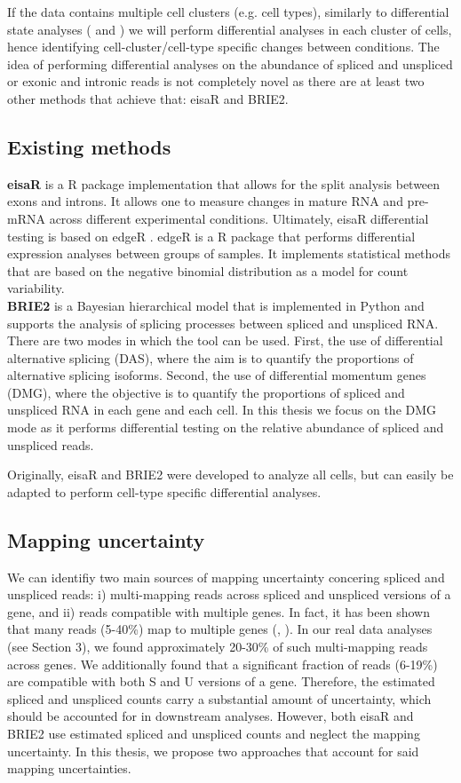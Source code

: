 If the data contains multiple cell clusters (e.g. cell types), similarly to differential state analyses (\cite{muscat} and \cite{distinct}) we will perform differential analyses in each cluster of cells, hence identifying cell-cluster/cell-type specific changes between conditions. The idea of performing differential analyses on the abundance of spliced and unspliced or exonic and intronic reads is not completely novel as there are at least two other methods that achieve that: eisaR and BRIE2.

\subsection{Existing methods}

\textbf{eisaR} \citep{eisar} is a R package implementation that allows for the split analysis between exons and introns. It allows one to measure changes in mature RNA and pre-mRNA across different experimental conditions. Ultimately, eisaR differential testing is based on edgeR \citep{edger}. edgeR is a R package that performs differential expression analyses between groups of samples. It implements statistical methods that are based on the negative binomial distribution as a model for count variability. \\

\noindent \textbf{BRIE2} \citep{brie2} is a Bayesian hierarchical model that is implemented in Python and supports the analysis of splicing processes between spliced and unspliced RNA. There are two modes in which the tool can be used. First, the use of differential alternative splicing (DAS), where the aim is to quantify the proportions of alternative splicing isoforms. Second, the use of differential momentum genes (DMG), where the objective is to quantify the proportions of spliced and unspliced RNA in each gene and each cell. In this thesis we focus on the DMG mode as it performs differential testing on the relative abundance of spliced and unspliced reads.

Originally, eisaR and BRIE2 were developed to analyze all cells, but can easily be adapted to perform cell-type specific differential analyses.

\subsection{Mapping uncertainty}
We can identifiy two main sources of mapping uncertainty concering spliced and unspliced reads: i) multi-mapping reads across spliced and unspliced versions of a gene, and ii) reads compatible with multiple genes. In fact, it has been shown that many reads (5-40\%) map to multiple genes (\cite{mapping1}, \cite{mapping2}). In our real data analyses (see Section 3), we found approximately 20-30\% of such multi-mapping reads across genes. We additionally found that a significant fraction of reads (6-19\%) are compatible with both S and U versions of a gene. Therefore, the estimated spliced and unspliced counts carry a substantial amount of uncertainty, which should be accounted for in downstream analyses. However, both eisaR and BRIE2 use estimated spliced and unspliced counts and neglect the mapping uncertainty. In this thesis, we propose two approaches that account for said mapping uncertainties.
